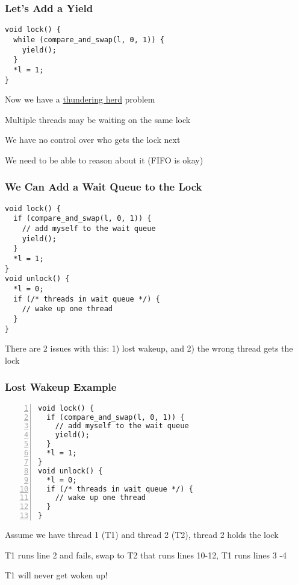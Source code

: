   \begin{frame}[fragile]
    \frametitle{Let's Add a Yield}

    \begin{lstlisting}
void lock() {
  while (compare_and_swap(l, 0, 1)) {
    yield();
  }
  *l = 1;
}
    \end{lstlisting}

    \vspace{2em}

    Now we have a 
    \href{https://en.wikipedia.org/wiki/Thundering_herd_problem}{thundering herd}
    problem

    \hspace{2em} Multiple threads may be waiting on the same lock

    \vspace{2em}

    We have no control over who gets the lock next

    \hspace{2em} We need to be able to reason about it (FIFO is okay)
  \end{frame}

  \begin{frame}[fragile]
    \frametitle{We Can Add a Wait Queue to the Lock}

    \begin{lstlisting}
void lock() {
  if (compare_and_swap(l, 0, 1)) {
    // add myself to the wait queue
    yield();
  }
  *l = 1;
}
void unlock() {
  *l = 0;
  if (/* threads in wait queue */) {
    // wake up one thread
  }
}
    \end{lstlisting}

    There are 2 issues with this: 1) lost wakeup, and 2) the wrong thread gets
    the lock
  \end{frame}

  \begin{frame}[fragile]
    \frametitle{Lost Wakeup Example}

    \begin{lstlisting}[numbers=left]
void lock() {
  if (compare_and_swap(l, 0, 1)) {
    // add myself to the wait queue
    yield();
  }
  *l = 1;
}
void unlock() {
  *l = 0;
  if (/* threads in wait queue */) {
    // wake up one thread
  }
}
    \end{lstlisting}

    Assume we have thread 1 (T1) and thread 2 (T2), thread 2 holds the lock

    \hspace{2em} T1 runs line 2 and fails, swap to T2 that runs lines 10-12, T1
    runs lines 3 -4

    \hspace{4em} T1 will never get woken up!
  \end{frame}


